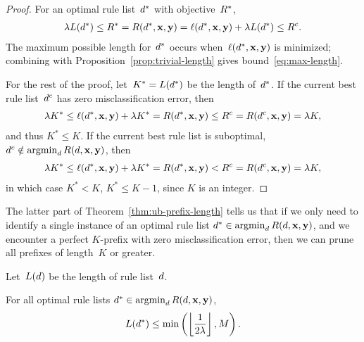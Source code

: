 \begin{arxiv}
\begin{proof}
For an optimal rule list~$d^*$ with objective~$R^*$,
\begin{align}
\Reg L(\OptimalRL) \le \OptimalObj = \Obj(\OptimalRL, \x, \y)
= \Loss(\OptimalRL, \x, \y) + \Reg L(\OptimalRL)
\le \CurrentObj.
\end{align}
The maximum possible length for~$d^*$ occurs
when~$\ell(d^*, \mathbf{x}, \mathbf{y})$ is minimized;
combining with Proposition~\ref{prop:trivial-length}
gives bound~\eqref{eq:max-length}.

For the rest of the proof,
let~${K^* = L(d^*)}$ be the length of~$d^*$.
%
If the current best rule list~$d^c$ has zero
misclassification error, then
\begin{align}
\Reg K^* \leq \Loss(\OptimalRL, \x, \y) + \Reg K^* = \Obj(\OptimalRL, \x, \y)
\le \CurrentObj = \Obj(\CurrentRL, \x, \y) = \Reg K,
\end{align}
and thus ${K^* \leq K}$.
%
If the current best rule list is suboptimal,
\ie ${d^c \notin \operatorname*{argmin}_{d} R({d}, \mathbf{x}, \mathbf{y})}$, then
%
\begin{align}
\Reg K^* \leq \Loss(\OptimalRL, \x, \y) + \Reg K^* = \Obj(\OptimalRL, \x, \y)
< \CurrentObj = \Obj(\CurrentRL, \x, \y) = \Reg K,
\end{align}
in which case ${K^* < K}$, \ie ${K^* \leq K-1}$, since $K$ is an integer.
\end{proof}

The latter part of Theorem~\ref{thm:ub-prefix-length} tells us that
if we only need to identify a single instance of an optimal rule list
${d^* \in \operatorname*{argmin}_{d} R({d}, \mathbf{x}, \mathbf{y})}$, and we encounter a perfect
$K$-prefix with zero misclassification error, then we can prune all
prefixes of length~$K$ or greater.

\end{arxiv}

\begin{corollary}
\label{cor:ub-prefix-length}
\begin{arxiv}
Let~$L({d})$ be the length of rule list~${d}$.
\end{arxiv}
%
For all optimal rule lists ${d^* \in \operatorname*{argmin}_{d} R({d}, \mathbf{x}, \mathbf{y})}$,
\begin{align}
L(\OptimalRL) \le \min \left( \left\lfloor \frac{1}{2\Reg} \right\rfloor, M \right).
\label{eq:max-length-trivial}
\end{align}
\end{corollary}

